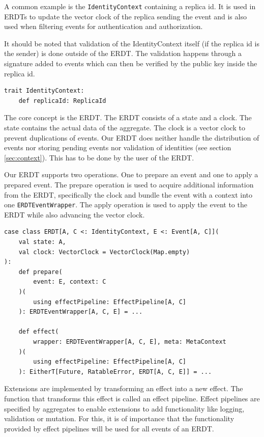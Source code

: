 \documentclass[
	english,
	ruledheaders=section,   %
	class=report,		    %
	thesis={type=bachelor}, %
	accentcolor=9c,			%
	custommargins=true,    %
	marginpar=false,        %
	parskip=half-,          %
	fontsize=11pt,          %
]{tudapub}
\begin{document}
A common example is the \texttt{IdentityContext} containing a replica id. It is used in ERDTs to update the vector clock of the replica sending the event and is also used when filtering events for authentication and authorization.

It should be noted that validation of the IdentityContext itself (if the replica id is the sender) is done outside of the ERDT. The validation happens through a signature added to events which can then be verified by the public key inside the replica id.

\begin{lstlisting}
trait IdentityContext:
	def replicaId: ReplicaId
\end{lstlisting}

The core concept is the ERDT. The ERDT consists of a state and a clock. The state contains the actual data of the aggregate. The clock is a vector clock to prevent duplications of events. Our ERDT does neither handle the distribution of events nor storing pending events nor validation of identities (see section \ref{sec:context}). This has to be done by the user of the ERDT.

Our ERDT supports two operations. One to prepare an event and one to apply a prepared event. The prepare operation is used to acquire additional information from the ERDT, specifically the clock and bundle the event with a context into one \texttt{ERDTEventWrapper}. The apply operation is used to apply the event to the ERDT while also advancing the vector clock.

\begin{lstlisting}
case class ERDT[A, C <: IdentityContext, E <: Event[A, C]](
	val state: A,
	val clock: VectorClock = VectorClock(Map.empty)
):
	def prepare(
		event: E, context: C
	)(
		using effectPipeline: EffectPipeline[A, C]
	): ERDTEventWrapper[A, C, E] = ...

	def effect(
		wrapper: ERDTEventWrapper[A, C, E], meta: MetaContext
	)(
		using effectPipeline: EffectPipeline[A, C]
	): EitherT[Future, RatableError, ERDT[A, C, E]] = ...
\end{lstlisting}

Extensions are implemented by transforming an effect into a new effect. The function that transforms this effect is called an effect pipeline. Effect pipelines are specified by aggregates to enable extensions to add functionality like logging, validation or mutation. For this, it is of importance that the functionality provided by effect pipelines will be used for all events of an ERDT. 
\end{document}
